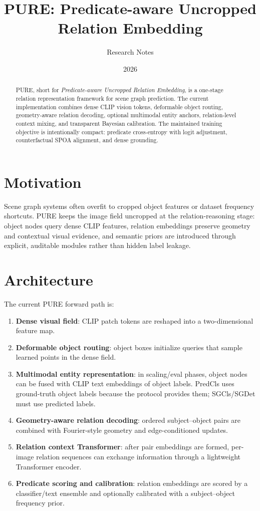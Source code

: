 \documentclass[11pt]{article}
\title{PURE: Predicate-aware Uncropped Relation Embedding}
\author{Research Notes}
\date{2026}
\begin{document}
\maketitle

\begin{abstract}
PURE, short for \emph{Predicate-aware Uncropped Relation Embedding}, is a one-stage relation representation framework for scene graph prediction. The current implementation combines dense CLIP vision tokens, deformable object routing, geometry-aware relation decoding, optional multimodal entity anchors, relation-level context mixing, and transparent Bayesian calibration. The maintained training objective is intentionally compact: predicate cross-entropy with logit adjustment, counterfactual SPOA alignment, and dense grounding.
\end{abstract}

\section{Motivation}
Scene graph systems often overfit to cropped object features or dataset frequency shortcuts. PURE keeps the image field uncropped at the relation-reasoning stage: object nodes query dense CLIP features, relation embeddings preserve geometry and contextual visual evidence, and semantic priors are introduced through explicit, auditable modules rather than hidden label leakage.

\section{Architecture}
The current PURE forward path is:
\begin{enumerate}[leftmargin=1.5em]
  \item \textbf{Dense visual field}: CLIP patch tokens are reshaped into a two-dimensional feature map.
  \item \textbf{Deformable object routing}: object boxes initialize queries that sample learned points in the dense field.
  \item \textbf{Multimodal entity representation}: in scaling/eval phases, object nodes can be fused with CLIP text embeddings of object labels. PredCls uses ground-truth object labels because the protocol provides them; SGCls/SGDet must use predicted labels.
  \item \textbf{Geometry-aware relation decoding}: ordered subject--object pairs are combined with Fourier-style geometry and edge-conditioned updates.
  \item \textbf{Relation context Transformer}: after pair embeddings are formed, per-image relation sequences can exchange information through a lightweight Transformer encoder.
  \item \textbf{Predicate scoring and calibration}: relation embeddings are scored by a classifier/text ensemble and optionally calibrated with a subject--object frequency prior.
\end{enumerate}
\end{document}
